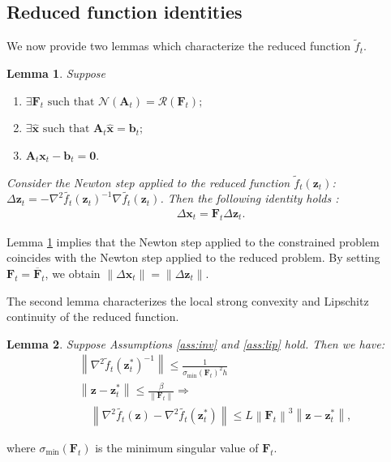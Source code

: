 \documentclass[journal,twoside,web]{ieeecolor}
\newtheorem{lemma}{Lemma}
\newcommand{\norm}[1]{\left\lVert#1\right\rVert}
\newcommand{\xx}{\mathbf{x}}
\newcommand{\bb}{\mathbf{b}}
\newcommand{\zz}{\mathbf{z}}
\renewcommand{\AA}{\mathbf{A}}
\newcommand{\FF}{\mathbf{F}}
\newcommand{\FFt}{\mathbf{F}_t}
\newcommand{\xh}{\mathbf{\hat{x}}}
\begin{document}
\subsection{Reduced function identities}

We now provide two lemmas which characterize the reduced function $\tilde{f}_t$.


\begin{lemma}\label{lemz}\cite[Section 10.2.3]{boyd}
Suppose
\begin{enumerate}
    \item $\exists \FF_t \text{ such that } \mathcal{N}(\AA_t) = \mathcal{R}(\FF_t);$
    \item $\exists \xh \text{ such that } \AA_t\xh=\bb_t;$
    \item $\AA_t\xx_t-\bb_t=\mathbf{0}.$
\end{enumerate}
Consider the Newton step applied to the reduced function $\tilde{f}_t(\zz_t)$:
$\Delta \zz_t = -\nabla^2\tilde{f_t}(\zz_t)^{-1}\nabla \tilde{f_t}(\zz_t)$.
Then the following identity holds :
\begin{align}
    \Delta \xx_t = \FF_t \Delta \zz_t.
\end{align}
\end{lemma}
Lemma \ref{lemz} implies that the Newton step applied to the constrained problem coincides with the Newton step applied to the reduced problem. By setting $\FF_t=\overline{\FF}_t$, we obtain $\norm{\Delta\xx_t} = \norm{\Delta\zz_t}$.


The second lemma characterizes the local strong convexity and Lipschitz continuity of the reduced function.
\begin{lemma}
\label{lem:const}
Suppose Assumptions \ref{ass:inv} and \ref{ass:lip} hold. Then we have:
\begin{align}
\label{constants1}
    &\norm{\nabla^2 \tilde{f}_t(\zz_t^*)^{-1}} \le \frac{1}{\sigma_{\min}(\FF_t)^2h}\\
    &\norm{\zz-\zz^*_t}\le \frac{\beta}{\norm{\FF_t}}\Rightarrow\nonumber\\
    \label{constants2}
    &\quad\norm{\nabla^2\tilde{f_t}(\zz)-\nabla^2\tilde{f_t}(\zz_t^*)}\le L\norm{\FF_t}^3\norm{\zz-\zz_t^*},
\end{align}
\end{lemma}
where $\sigma_{\min}(\FFt)$ is the minimum singular value of $\FFt$.
\end{document}
